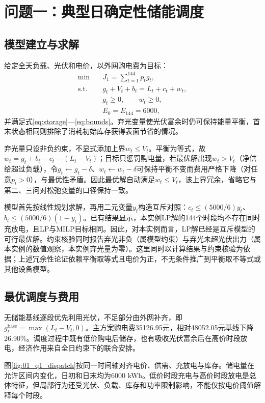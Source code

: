 \section{问题一：典型日确定性储能调度}
\subsection{模型建立与求解}
给定全天负载、光伏和电价，以外网购电费为目标：
\begin{align}
\min\quad &J_1=\sum_{t=1}^{144}p_tg_t,\label{eq:q1obj}\\
\text{s.t.}\quad &g_t+V_t+b_t=L_t+c_t+w_t,\label{eq:q1balance}\\
&g_t\ge0,\qquad w_t\ge0,\\
&E_0=E_{144}=6000,
\end{align}
并满足式\eqref{eq:storage}—\eqref{eq:bounds}。弃光变量使光伏富余时仍可保持能量平衡，首末状态相同则排除了消耗初始库存获得表面节省的情况。

弃光量只设非负约束，不显式添加上界$w_t\le V_t$。平衡为等式，故$w_t=g_t+b_t-c_t-(L_t-V_t)$；目标只惩罚购电量，若最优解出现$w_t>V_t$（净供给超过负载），令$g_t\leftarrow g_t-\delta$、$w_t\leftarrow w_t-\delta$可保持平衡不变而费用严格下降（对任意$p_t>0$），与最优性矛盾。因此最优解自动满足$w_t\le V_t$，该上界冗余，省略它与第二、三问对松弛变量的口径保持一致。

模型首先按线性规划求解，再用二元变量$y_t$构造互斥对照：$c_t\le(5000/6)y_t$、$b_t\le(5000/6)(1-y_t)$。已有结果显示，本实例LP解的144个时段均不存在同时充放电，且LP与MILP目标相同。因此，对本实例而言，LP解已经是互斥模型的可行最优解。约束核验同时报告弃光非负（属模型约束）与弃光未超光伏出力（属本实例的数值观察，本实例弃光量为零）。这里同时以计算结果与约束核验为依据；上述冗余性论证依赖平衡取等式且电价为正，不无条件推广到平衡取不等式或其他设备模型。

\subsection{最优调度与费用}

无储能基线逐段优先利用光伏，不足部分由外网补齐，即$g_t^{\mathrm{base}}=\max(L_t-V_t,0)$。主方案购电费35126.95元，相对48052.05元基线下降26.90\%。调度过程中既有低价购电后储存，也有吸收光伏富余后在高价时段放电，经济作用来自全日约束下的联合安排。

图\ref{fig:01_q1_dispatch}按同一时间轴对齐电价、供需、充放电与库存。储电量在允许区间内变化，日初和日末均为6000 kWh。低价时段充电与高价时段放电是总体特征，但局部行为还受光伏、负载、库存和功率限制影响，不能仅按电价阈值解释每个时段。

